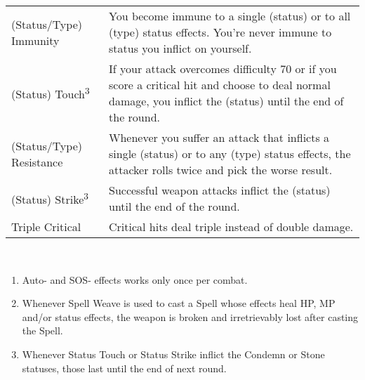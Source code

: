 \begin{table}[ht]
\begin{tabular}{p{}<{\arraybackslash\dotfill}@{.}>{\raggedleft\arraybackslash\dotfill}p{}}
        (Status/Type) Immunity & You become immune to a single (status) or to all (type) status effects. You're never immune to status you inflict on yourself. \\
        (Status) Touch\textsuperscript{3} & If your attack overcomes difficulty 70 or if you score a critical hit and choose to deal normal damage, you inflict the (status) until the end of the round. \\
        (Status/Type) Resistance & Whenever you suffer an attack that inflicts a single (status) or to any (type) status effects, the attacker rolls twice and pick the worse result. \\
        (Status) Strike\textsuperscript{3} & Successful weapon attacks inflict the (status) until the end of the round. \\
        Triple Critical & Critical hits deal triple instead of double damage. \\
        \end{tabular} \\
\end{table}
\begin{footnotesize}
\begin{enumerate}
    \item Auto- and SOS- effects works only once per combat.
    \item Whenever Spell Weave is used to cast a Spell whose effects heal HP, MP and/or status effects, the weapon is broken and irretrievably lost after casting the Spell.
    \item Whenever Status Touch or Status Strike inflict the Condemn or Stone statuses, those last until the end of next round.
\end{enumerate}
\end{footnotesize}